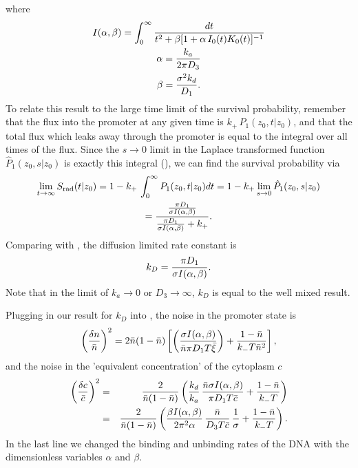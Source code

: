 where
\begin{gather}
 I(\alpha,\beta) = \int_0^{\infty} \frac{dt}{t^2 + \beta[1 + \alpha \, I_0(t) K_0(t)]^{-1}} \\
 \alpha = \frac{k_a}{2 \pi D_3} \elabel{EqAlpha} \\
 \beta = \frac{\sigma^2 k_d}{D_1} \elabel{EqBeta}.
\end{gather}
To relate this result to the large time limit of the survival probability, remember that the flux into the promoter at any given time is $k_+\,P_1(z_0,t|z_0)$, and that the total flux which leaks away through the promoter is equal to the integral over all times of the flux. Since the $s \to 0$ limit in the Laplace transformed function $\hat{P}_1(z_0,s|z_0)$ is exactly this integral (), we can find the survival probability via
\begin{gather}
  \lim_{t \to \infty}S_{\rm rad}(t|z_0) = 1 - k_+ \, \int_0^{\infty} P_1(z_0, t|z_0) dt = 1 - k_+ \lim_{s \to 0} \hat{P}_1(z_0, s|z_0) \\
= \frac{\frac{\pi D_1}{\sigma I(\alpha,\beta)}}{\frac{\pi D_1}{\sigma I(\alpha,\beta)} + k_+}.
\end{gather}
Comparing with , the diffusion limited rate constant is
\begin{equation}
 k_D = \frac{\pi D_1}{\sigma I(\alpha,\beta)}.
 \elabel{kDFullJ}
\end{equation}
Note that in the limit of $k_a\to0$ or $D_3\to\infty$, $k_D$ is equal to the well mixed result.

Plugging in our result for $k_D$ into , the noise in the promoter state is
\begin{equation}
 \elabel{NoiseProFull}
 \left( \frac{\delta n}{\bar{n}} \right)^2 = 2 \bar{n}(1-\bar{n})\left[\left( \frac{\sigma I(\alpha,\beta)}{\bar{n} \pi D_1 T \bar{\xi}} \right)+\frac{1-\bar{n}}{k_- T \bar{n}^2} \right],
\end{equation}
and the noise in the 'equivalent concentration' of the cytoplasm $c$
\begin{eqnarray}
 \elabel{NoiseCFull} 
 \left( \frac{\delta c}{\bar{c}} \right)^2 & = & \frac{2}{\bar{n}(1-\bar{n})} \left( \frac{k_d}{k_a} \, \frac{\bar{n} \sigma I(\alpha,\beta)}{\pi D_1 T \bar{c}} + \frac{1-\bar{n}}{k_- T}  \right) \\
 \elabel{NoiseCFull2}
 & = & \frac{2}{\bar{n}(1-\bar{n})} \left( \frac{\beta I(\alpha,\beta)}{2 \pi^2 \alpha} \, \frac{\bar{n}}{D_3 T \bar{c}} \, \frac{1}{\sigma} + \frac{1-\bar{n}}{k_- T}  \right).
\end{eqnarray}
In the last line we changed the binding and unbinding rates of the DNA with the dimensionless variables $\alpha$ and $\beta$.


